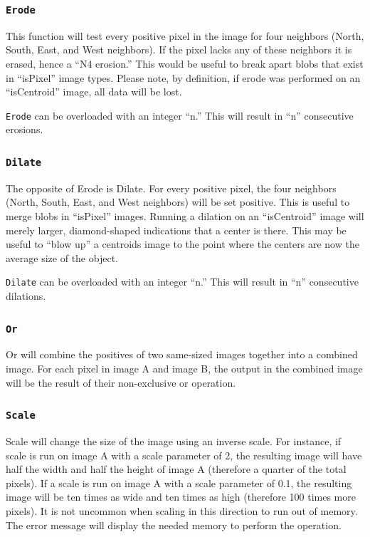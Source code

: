 \documentclass[12pt]{article}
\begin{document}
\subsubsection{\tt Erode}

This function will test every positive pixel in the image for four neighbors (North, South, East, and West neighbors). If the pixel lacks any of these neighbors it is erased, hence a ``N4 erosion.'' This would be useful to break apart blobs that exist in ``isPixel'' image types. Please note, by definition, if erode was performed on an ``isCentroid'' image, all data will be lost.

{\tt Erode} can be overloaded with an integer ``n.'' This will result in ``n'' consecutive erosions.

\subsubsection{\tt Dilate}

The opposite of Erode is Dilate. For every positive pixel, the four neighbors (North, South, East, and West neighbors) will be set positive. This is useful to merge blobs in ``isPixel'' images. Running a dilation on an ``isCentroid'' image will merely larger, diamond-shaped indications that a center is there. This may be useful to ``blow up'' a centroids image to the point where the centers are now the average size of the object.

{\tt Dilate} can be overloaded with an integer ``n.'' This will result in ``n'' consecutive dilations.

\subsubsection{\tt Or}

Or will combine the positives of two same-sized images together into a combined image. For each pixel in image A and image B, the output in the combined image will be the result of their non-exclusive or operation.

\subsubsection{\tt Scale}

Scale will change the size of the image using an inverse scale. For instance, if scale is run on image A with a scale parameter of 2, the resulting image will have half the width and half the height of image A (therefore a quarter of the total pixels). If a scale is run on image A with a scale parameter of 0.1, the resulting image will be ten times as wide and ten times as high (therefore 100 times more pixels). It is not uncommon when scaling in this direction to run out of memory. The error message will display the needed memory to perform the operation.
\end{document}
